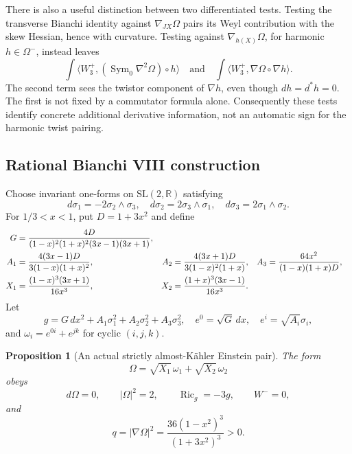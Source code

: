\documentclass[11pt]{article}
\newcommand{\Ric}{\operatorname{Ric}}
\newcommand{\R}{\mathbb R}
\newtheorem{proposition}[theorem]{Proposition}
\theoremstyle{definition}
\theoremstyle{remark}
\begin{document}
There is also a useful distinction between two differentiated tests.
Testing the transverse Bianchi identity against $\nabla_{JX}\Omega$
pairs its Weyl contribution with the skew Hessian, hence with curvature.
Testing against $\nabla_{h(X)}\Omega$, for harmonic $h\in\Omega^-$,
instead leaves
\begin{equation}
 \int\!\langle W_3^+,(\operatorname{Sym}_0\nabla^2\Omega)\circ h\rangle
 \quad\text{and}\quad
 \int\!\langle W_3^+,\nabla\Omega\circ\nabla h\rangle.
 \label{eq:unclosed-components}
\end{equation}
The second term sees the twistor component of $\nabla h$, even though
$dh=d^*h=0$. The first is not fixed by a commutator formula alone.
Consequently these tests identify concrete additional derivative information,
not an automatic sign for the harmonic twist pairing.

\subsection{Rational Bianchi VIII construction}
\label{sec:explicit}

Choose invariant one-forms on $\mathrm{SL}(2,\R)$ satisfying
\begin{equation}
 d\sigma_1=-2\sigma_2\wedge\sigma_3,\quad
 d\sigma_2=2\sigma_3\wedge\sigma_1,\quad
 d\sigma_3=2\sigma_1\wedge\sigma_2.
 \label{eq:VIII}
\end{equation}
For $1/3<x<1$, put $D=1+3x^2$ and define
\begin{align}
 G&=\frac{4D}{(1-x)^2(1+x)^2(3x-1)(3x+1)},\notag\\
 A_1&=\frac{4(3x-1)D}{3(1-x)(1+x)^2},&
 A_2&=\frac{4(3x+1)D}{3(1-x)^2(1+x)},&
 A_3&=\frac{64x^2}{(1-x)(1+x)D},\label{eq:VIII-metric}\\
 X_1&=\frac{(1-x)^3(3x+1)}{16x^3},&
 X_2&=\frac{(1+x)^3(3x-1)}{16x^3}.\label{eq:VIII-X}
\end{align}
Let
\[
 g=G\,dx^2+A_1\sigma_1^2+A_2\sigma_2^2+A_3\sigma_3^2,
 \quad e^0=\sqrt G\,dx,\quad e^i=\sqrt{A_i}\sigma_i,
\]
and $\omega_i=e^{0i}+e^{jk}$ for cyclic $(i,j,k)$.

\begin{proposition}[An actual strictly almost-K\"ahler Einstein pair]
\label{prop:VIII}
The form
\begin{equation}
 \Omega=\sqrt{X_1}\,\omega_1+\sqrt{X_2}\,\omega_2
 \label{eq:VIII-Omega}
\end{equation}
obeys
\begin{equation}
 d\Omega=0,\qquad |\Omega|^2=2,\qquad
 \Ric_g=-3g,\qquad W^-=0,
 \label{eq:VIII-properties}
\end{equation}
and
\begin{equation}
 q=|\nabla\Omega|^2
 =\frac{36(1-x^2)^3}{(1+3x^2)^3}>0.
 \label{eq:VIII-q}
\end{equation}
\end{proposition}
\end{document}
